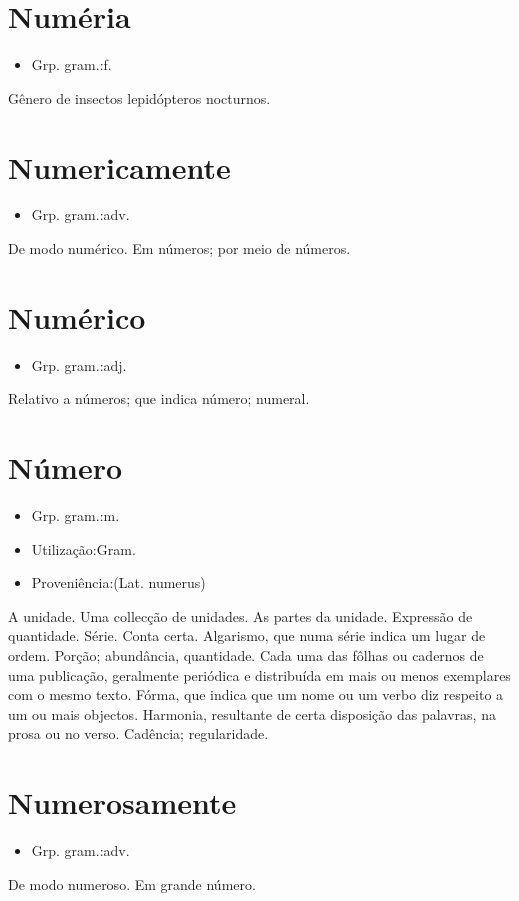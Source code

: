 \section{Numéria}
\begin{itemize}
\item {Grp. gram.:f.}
\end{itemize}
Gênero de insectos lepidópteros nocturnos.
\section{Numericamente}
\begin{itemize}
\item {Grp. gram.:adv.}
\end{itemize}
De modo numérico.
Em números; por meio de números.
\section{Numérico}
\begin{itemize}
\item {Grp. gram.:adj.}
\end{itemize}
Relativo a números; que indica número; numeral.
\section{Número}
\begin{itemize}
\item {Grp. gram.:m.}
\end{itemize}
\begin{itemize}
\item {Utilização:Gram.}
\end{itemize}
\begin{itemize}
\item {Proveniência:(Lat. \textunderscore numerus\textunderscore )}
\end{itemize}
A unidade.
Uma collecção de unidades.
As partes da unidade.
Expressão de quantidade.
Série.
Conta certa.
Algarismo, que numa série indica um lugar de ordem.
Porção; abundância, quantidade.
Cada uma das fôlhas ou cadernos de uma publicação, geralmente periódica e distribuída em mais ou menos exemplares com o mesmo texto.
Fórma, que indica que um nome ou um verbo diz respeito a um ou mais objectos.
Harmonia, resultante de certa disposição das palavras, na prosa ou no verso.
Cadência; regularidade.
\section{Numerosamente}
\begin{itemize}
\item {Grp. gram.:adv.}
\end{itemize}
De modo numeroso.
Em grande número.
